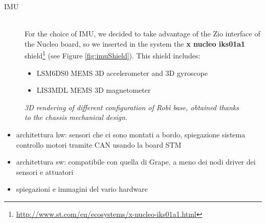 \begin{description}
	\item[IMU] \hfill \\ For the choice of \ac{IMU}, we decided to take advantage of the Zio interface of the Nucleo board, so we inserted in the system the \textbf{x nucleo iks01a1} shield\footnote{\url{http://www.st.com/en/ecosystems/x-nucleo-iks01a1.html}}
	(see Figure \ref{fig:imuShield}).
	This shield includes:
	\begin{itemize}
		\item LSM6DS0 MEMS 3D accelerometer and 3D gyroscope
		\item LIS3MDL MEMS 3D magnetometer
	\end{itemize}
\end{description}



\begin{figure}
	\centering
	\qquad
	\caption{\textit{3D rendering of different configuration of Robì base, obtained thanks to the chassis mechanical design.}}
	\label{fig:robiGrape}
\end{figure}


\begin{itemize}
	\item architettura hw: sensori che ci sono montati a bordo, spiegazione sistema controllo motori tramite CAN usando la board STM
	\item architettura sw: compatibile con quella di Grape, a meno dei nodi driver dei sensori e attuatori
	\item spiegazioni e immagini del vario hardware
\end{itemize}
